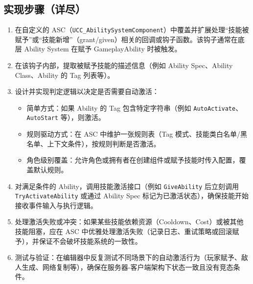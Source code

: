 \documentclass[10pt,CJKmath]{zhbook-v1}
\newcommand{\il}[1]{\texttt{#1}}%
\begin{document}
\subsection{实现步骤（详尽）}
\begin{enumerate}
\item 在自定义的 ASC（\il{UCC_AbilitySystemComponent}）中覆盖并扩展处理“技能被赋予”或“技能新增”（grant/given）相关的回调或钩子函数。该钩子通常在底层 Ability System 在赋予 GameplayAbility 时被触发。
\item 在该钩子内部，提取被赋予技能的描述信息（例如 Ability Spec、Ability Class、Ability 的 Tag 列表等）。
\item 设计并实现判定逻辑以决定是否需要自动激活：
\begin{itemize}
\item 简单方式：如果 Ability 的 Tag 包含特定字符串（例如 \texttt{AutoActivate}、\texttt{AutoStart} 等），则激活。
\item 规则驱动方式：在 ASC 中维护一张规则表（Tag 模式、技能类白名单/黑名单、上下文条件），按规则判断是否激活。
\item 角色级别覆盖：允许角色或拥有者在创建组件或赋予技能时传入配置，覆盖默认规则。
\end{itemize}
\item 对满足条件的 Ability，调用技能激活接口（例如 \texttt{GiveAbility} 后立刻调用 \texttt{TryActivateAbility} 或通过 Ability Spec 标记为已激活状态），确保技能开始接收事件输入与执行逻辑。
\item 处理激活失败或冲突：如果某些技能依赖资源（Cooldown、Cost）或被其他技能阻塞，应在 ASC 中优雅处理激活失败（记录日志、重试策略或回滚赋予），并保证不会破坏技能系统的一致性。
\item 测试与验证：在编辑器中反复测试不同场景下的自动激活行为（玩家赋予、敌人生成、网络复制等），确保在服务器-客户端架构下状态一致且没有竞态条件。
\end{enumerate}
\end{document}
